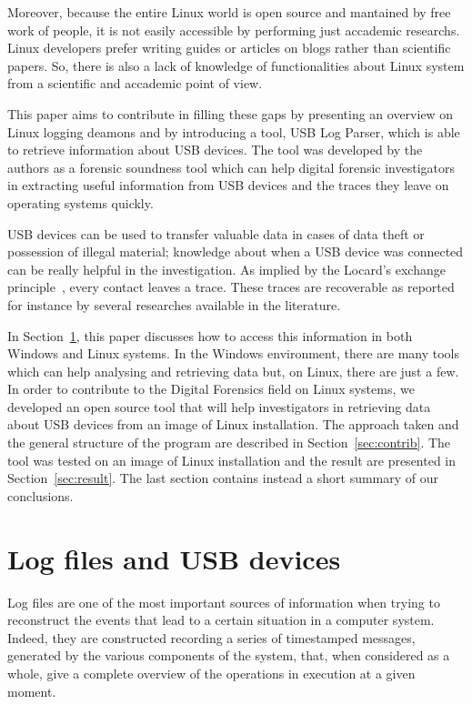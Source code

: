 \documentclass[a4paper]{article}
\begin{document}
Moreover, because the entire Linux world is open source and mantained by free
work of people, it is not easily accessible by performing just accademic
researchs. Linux developers prefer writing guides or articles on blogs rather
than scientific papers. So, there is also a lack of knowledge of functionalities
about Linux system from a scientific and accademic point of view.

This paper aims to contribute in filling these gaps by presenting an overview on
Linux logging deamons and by introducing a tool, USB Log Parser, which is able
to retrieve information about USB devices. The tool was developed by the authors
as a forensic soundness tool which can help digital forensic investigators in
extracting useful information from USB devices and the traces they leave on
operating systems quickly.

USB devices can be used to transfer valuable data in cases of data theft or
possession of illegal material; knowledge about when a USB device was connected
can be really helpful in the investigation. As implied by the Locard's exchange
principle~\cite{locard2008locard}, every contact leaves a trace. These traces are
recoverable as reported for instance by several researches available in the
literature.~\cite{Tanushree12,Abhijeet14}

In Section~\ref{sec:lit}, this paper discusses how to access this information in
both Windows and Linux systems. In the Windows environment, there are many tools
which can help analysing and retrieving data but, on Linux, there are just a
few. In order to contribute to the Digital Forensics field on Linux systems, we
developed an open source tool that will help investigators in retrieving data
about USB devices from an image of Linux installation. The approach taken and
the general structure of the program are described in Section~\ref{sec:contrib}.
The tool was tested on an image of Linux installation and the result are
presented in Section~\ref{sec:result}. The last section contains instead a short
summary of our conclusions.

\section{Log files and USB devices}
\label{sec:lit}
Log files are one of the most important sources of information when trying to
reconstruct the events that lead to a certain situation in a computer system.
Indeed, they are constructed recording a series of timestamped messages,
generated by the various components of the system, that, when considered as a
whole, give a complete overview of the operations in execution at a given
moment.
\end{document}
